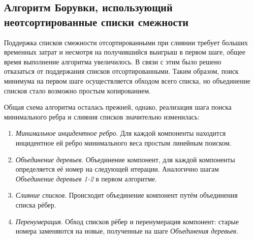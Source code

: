 \documentclass{article}
\begin{document}
\subsection{Алгоритм Борувки, использующий неотсортированные списки смежности}

Поддержка списков смежности отсортированными при слиянии требует больших временных затрат и несмотря на получившийся выигрыш в первом шаге, общее время выполнение алгоритма увеличилось.
В связи с этим было решено отказаться от поддержания списков отсортированными. Таким образом, поиск минимума на первом шаге осуществляется обходом всего списка, но объединение списков стало возможно простым копированием.

Общая схема алгоритма осталась прежней, однако, реализация шага поиска минимального ребра и слияния списков значительно изменилась:
\begin{enumerate}
    \item \textit{Минимальное инцидентное ребро}.
        Для каждой компоненты находится инцидентное ей ребро минимального веса простым линейным поиском.
    \item \textit{Объединение деревьев}.
        Объединение компонент, для каждой компоненты определяется её номер на следующей итерации. 
        Аналогично шагам \textit{Объединение деревьев 1-2} в первом алгоритме.
    \item \textit{Слияние списков}.
        Происходит объединение компонент путём объединения списка рёбер.
    \item \textit{Перенумерация}.
        Обход списков рёбер и перенумерация компонент: старые номера заменяются на новые, полученные на шаге \textit{Объединения деревьев}.
\end{enumerate}


\end{document}
